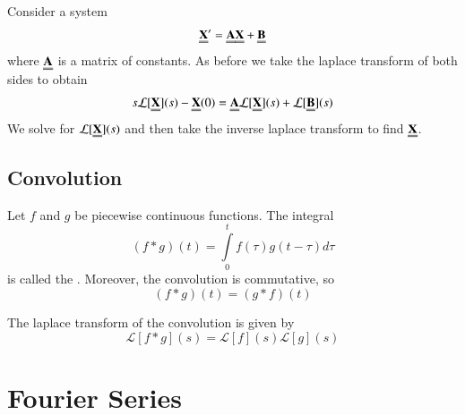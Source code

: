 \documentclass[12pt, a4paper, oneside, openright, titlepage]{book}
\begin{document}


\begin{defn}
        Consider a system \begin{equation}
                \Emph{X}' = \Emph{A}\Emph{X}+\Emph{B}
        \end{equation}
        where $\Emph{A}$ is a matrix of constants. As before we take the laplace transform of both sides to obtain \begin{equation}
                s\mathcal{L}[\Emph{X}](s)-\Emph{X}(0) = \Emph{A}\mathcal{L}[\Emph{X}](s) + \mathcal{L}[\Emph{B}](s)
        \end{equation}
        We solve for $\mathcal{L}[\Emph{X}](s)$ and then take the inverse laplace transform to find $\Emph{X}$.
\end{defn}




\section{Convolution}

\begin{defn}[Convolution]
        Let $f$ and $g$ be piecewise continuous functions. The integral \begin{equation}
                (f*g)(t) = \int\limits_0^tf(\tau)g(t-\tau)d\tau
        \end{equation}
        is called the . Moreover, the convolution is commutative, so \begin{equation}
                (f*g)(t) = (g*f)(t)
        \end{equation}
\end{defn}




\begin{props}
        The laplace transform of the convolution is given by \begin{equation}
                \mathcal{L}[f*g](s) = \mathcal{L}[f](s)\mathcal{L}[g](s)
        \end{equation}
\end{props}




\clearpage

\chapter{Fourier Series}
\end{document}
